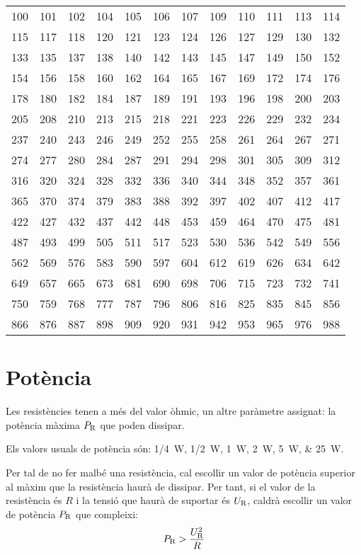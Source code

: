 \begin{center}
   \begin{tabular}{cccccccccccc}
   \toprule[1pt]
   100 & 101 & 102 & 104 & 105 & 106 & 107 & 109 & 110 & 111 & 113 & 114 \\
   115 & 117 & 118 & 120 & 121 & 123 & 124 & 126 & 127 & 129 & 130 & 132 \\
   133 & 135 & 137 & 138 & 140 & 142 & 143 & 145 & 147 & 149 & 150 & 152 \\
   154 & 156 & 158 & 160 & 162 & 164 & 165 & 167 & 169 & 172 & 174 & 176 \\
   178 & 180 & 182 & 184 & 187 & 189 & 191 & 193 & 196 & 198 & 200 & 203 \\
   205 & 208 & 210 & 213 & 215 & 218 & 221 & 223 & 226 & 229 & 232 & 234 \\
   237 & 240 & 243 & 246 & 249 & 252 & 255 & 258 & 261 & 264 & 267 & 271 \\
   274 & 277 & 280 & 284 & 287 & 291 & 294 & 298 & 301 & 305 & 309 & 312 \\
   316 & 320 & 324 & 328 & 332 & 336 & 340 & 344 & 348 & 352 & 357 & 361 \\
   365 & 370 & 374 & 379 & 383 & 388 & 392 & 397 & 402 & 407 & 412 & 417 \\
   422 & 427 & 432 & 437 & 442 & 448 & 453 & 459 & 464 & 470 & 475 & 481 \\
   487 & 493 & 499 & 505 & 511 & 517 & 523 & 530 & 536 & 542 & 549 & 556 \\
   562 & 569 & 576 & 583 & 590 & 597 & 604 & 612 & 619 & 626 & 634 & 642 \\
   649 & 657 & 665 & 673 & 681 & 690 & 698 & 706 & 715 & 723 & 732 & 741 \\
   750 & 759 & 768 & 777 & 787 & 796 & 806 & 816 & 825 & 835 & 845 & 856 \\
   866 & 876 & 887 & 898 & 909 & 920 & 931 & 942 & 953 & 965 & 976 & 988 \\
   \bottomrule[1pt]
   \end{tabular}
\end{center}


\section{Potència} \label{sec:resist-pot}

Les resistències tenen a més del valor òhmic, un altre paràmetre assignat: la potència màxima $P_\mathrm{R}$ que poden dissipar.

Els valors usuals de potència són: \SIlist{1/4;1/2;1;2;5;25}{W}.

Per tal de no fer malbé una resistència, cal escollir un valor de potència superior al màxim que la resistència haurà de dissipar. Per tant, si el valor de la resistència és $R$ i la tensió  que haurà de suportar és $U_\mathrm{R}$, caldrà escollir un valor de potència $P_\mathrm{R}$ que compleixi:
\begin{equation}
  P_\mathrm{R} > \frac{U_\mathrm{R}^2}{R}
\end{equation}

